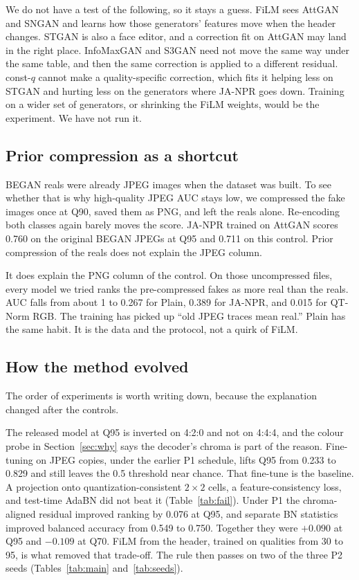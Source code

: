 \documentclass[conference]{IEEEtran}
\begin{document}
We do not have a test of the following, so it stays a guess. FiLM sees AttGAN and SNGAN and learns how those generators' features move when the header changes. STGAN is also a face editor, and a correction fit on AttGAN may land in the right place. InfoMaxGAN and S3GAN need not move the same way under the same table, and then the same correction is applied to a different residual. const-$q$ cannot make a quality-specific correction, which fits it helping less on STGAN and hurting less on the generators where JA-NPR goes down. Training on a wider set of generators, or shrinking the FiLM weights, would be the experiment. We have not run it.

\subsection{Prior compression as a shortcut}
\label{sec:shortcut}
BEGAN reals were already JPEG images when the dataset was built. To see whether that is why high-quality JPEG AUC stays low, we compressed the fake images once at Q90, saved them as PNG, and left the reals alone. Re-encoding both classes again barely moves the score. JA-NPR trained on AttGAN scores 0.760 on the original BEGAN JPEGs at Q95 and 0.711 on this control. Prior compression of the reals does not explain the JPEG column.

It does explain the PNG column of the control. On those uncompressed files, every model we tried ranks the pre-compressed fakes as more real than the reals. AUC falls from about 1 to 0.267 for Plain, 0.389 for JA-NPR, and 0.015 for QT-Norm RGB. The training has picked up ``old JPEG traces mean real.'' Plain has the same habit. It is the data and the protocol, not a quirk of FiLM.

\subsection{How the method evolved}
The order of experiments is worth writing down, because the explanation changed after the controls.

The released model at Q95 is inverted on 4:2:0 and not on 4:4:4, and the colour probe in Section~\ref{sec:why} says the decoder's chroma is part of the reason. Fine-tuning on JPEG copies, under the earlier P1 schedule, lifts Q95 from 0.233 to 0.829 and still leaves the 0.5 threshold near chance. That fine-tune is the baseline. A projection onto quantization-consistent $2{\times}2$ cells, a feature-consistency loss, and test-time AdaBN did not beat it (Table~\ref{tab:fail}). Under P1 the chroma-aligned residual improved ranking by 0.076 at Q95, and separate BN statistics improved balanced accuracy from 0.549 to 0.750. Together they were $+0.090$ at Q95 and $-0.109$ at Q70. FiLM from the header, trained on qualities from 30 to 95, is what removed that trade-off. The rule then passes on two of the three P2 seeds (Tables~\ref{tab:main} and~\ref{tab:seeds}).
\end{document}
